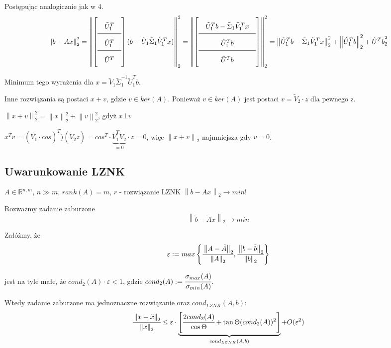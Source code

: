 \documentclass[hidelinks,a4paper,fleqn,oneside]{book}
\newcommand{\RR}{\mathbb{R}}
\newcommand{\ra}{\rightarrow}
\newcommand{\norm}[1]{\left\lVert#1\right\rVert}
\begin{document}
Postępując analogicznie jak w 4.
\[\arraycolsep=1em\def\arraystretch{2}
\norm{b - Ax}_2^2 = \norm{\left[ \begin{array}{c}
\tilde{U}_1^T \\ \hline
\hat{U}_1^T \\ \hline
\tilde{U}^T 
\end{array}\right] (b - \tilde{U}_1 \tilde{\Sigma}_1 \tilde{V}_1^Tx)}_2^2 = \norm{\left[\begin{array}{c}
\tilde{U}_1^Tb - \tilde{\Sigma}_1\tilde{V}_1^Tx \\ \hline
\hat{U}_1^T b\\ \hline
\tilde{U}^T b 
\end{array}\right]}_2^2 = 
\norm{\tilde{U}_1^Tb - \tilde{\Sigma}_1\tilde{V}_1^Tx}_2^2 +  \norm{\hat{U}_1^Tb}_2^2 + {\hat{U}^Tb}_2^2
\]

Minimum tego wyrażenia dla $x = \tilde{V}_1\tilde{\Sigma}_1^{-1} \tilde{U}_1^Tb$.

Inne rozwiązania są postaci $x+v$, gdzie $v \in ker(A)$. Ponieważ $v \in ker(A)$ jest postaci $v = \tilde{V}_2 \cdot z$ dla pewnego z.

$\norm{x + v}_2^2 = \norm{x}_2^2 + \norm{v}_2^2$, gdyż $x \bot v$

$x^Tv = (\tilde{V_1} \cdot cos)^T) (\tilde{V}_2z) = cos^T \cdot \underbrace{\tilde{V}_1^T\tilde{V}_2}_{=0}\cdot z = 0$, więc $\norm{x + v}_2$ najmniejsza gdy $v = 0$.

\subsection{Uwarunkowanie LZNK}
$A \in \RR^{n,m}$, $n \gg m$, $rank(A) = m$, $r$ - rozwiązanie LZNK $\norm{b - Ax}_2 \ra min!$

Rozważmy zadanie zaburzone
\[\norm{\tilde{b} - \tilde{A}\tilde{x}}_2 \ra min\]

Załóżmy, że
\[
	\varepsilon := max \left\{ \cfrac{\norm{A - \tilde{A}}_2}{\norm{A} _2}, \cfrac{\norm{b - \tilde{b}}_2}{\norm{b}_2} \right\}
\]

jest na tyle małe, że $cond_2(A) \cdot \varepsilon < 1$, gdzie $cond_2(A) := \cfrac{\sigma_{max}(A)}{\sigma_{min}(A)}$.

Wtedy zadanie zaburzone ma jednoznaczne rozwiązanie oraz $cond_{LZNK}(A, b)$:
\[
	\cfrac{\norm{x - \tilde{x}}_2}{\norm{x}_2} \leq \varepsilon \cdot \underbrace{\left[ \cfrac{2 cond_2(A)}{\cos{\Theta}} + \tan{\Theta}(cond_2(A))^2 \right]}_{cond_{LZNK}(A, b)} + O(\varepsilon^2)
\]
\end{document}
